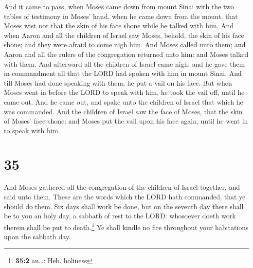  And it came to pass, when Moses came down from mount
Sinai with the two tables of testimony in Moses' hand, when he came down
from the mount, that Moses wist not that the skin of his face shone
while he talked with him.  And when Aaron and all the
children of Israel saw Moses, behold, the skin of his face shone; and
they were afraid to come nigh him.  And Moses called unto
them; and Aaron and all the rulers of the congregation returned unto
him: and Moses talked with them.  And afterward all the
children of Israel came nigh: and he gave them in commandment all that
the LORD had spoken with him in mount Sinai.  And till
Moses had done speaking with them, he put a vail on his face.
 But when Moses went in before the LORD to speak with
him, he took the vail off, until he came out. And he came out, and spake
unto the children of Israel that which he was commanded. 
And the children of Israel saw the face of Moses, that the skin of
Moses' face shone: and Moses put the vail upon his face again, until he
went in to speak with him.

\hypertarget{section-34}{%
\section{35}\label{section-34}}

 And Moses gathered all the congregation of the children
of Israel together, and said unto them, These are the words which the
LORD hath commanded, that ye should do them.  Six days
shall work be done, but on the seventh day there shall be to you an holy
day, a sabbath of rest to the LORD: whosoever doeth work therein shall
be put to death.\footnote{\textbf{35:2} an\ldots: Heb. holiness}
 Ye shall kindle no fire throughout your habitations upon
the sabbath day.

